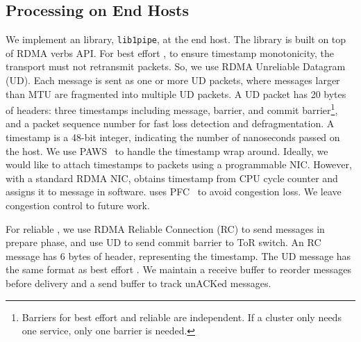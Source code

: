 \subsection{Processing on End Hosts}


We implement an \sys{} library, \texttt{lib1pipe}, at the end host. The library is built on top of RDMA verbs API.
For best effort \sys{}, to ensure timestamp monotonicity, the transport must not retransmit packets.
So, we use RDMA Unreliable Datagram (UD).
Each \sys{} message is sent as one or more UD packets, where \sys{} messages larger than MTU are fragmented into multiple UD packets.
A UD packet has 20 bytes of headers: three timestamps including message, barrier, and commit barrier\footnote{Barriers for best effort and reliable \sys{} are independent. If a cluster only needs one service, only one barrier is needed.}, and a packet sequence number for fast loss detection and defragmentation.
A timestamp is a 48-bit integer, indicating the number of nanoseconds passed on the host. %
We use PAWS~\cite{jacobson1992tcp} to handle the timestamp wrap around.
Ideally, we would like to attach timestamps to packets using a programmable NIC.
However, with a standard RDMA NIC, \sys{} obtains timestamp from CPU cycle counter and assigns it to message in software.
\sys{} uses PFC~\cite{pfc} to avoid congestion loss. We leave congestion control to future work.

For reliable \sys{}, we use RDMA Reliable Connection (RC) to send messages in prepare phase, and use UD to send commit barrier to ToR switch.
An RC message has 6 bytes of header, representing the timestamp.
The UD message has the same format as best effort \sys{}.
We maintain a receive buffer to reorder messages before delivery and a send buffer to track unACKed messages.

